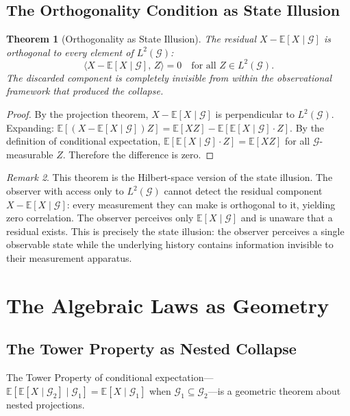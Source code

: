 \documentclass[12pt, a4paper, openany]{book}
\theoremstyle{plain}
\newtheorem{theorem}{Theorem}[chapter]
\theoremstyle{definition}
\theoremstyle{remark}
\newtheorem{remark}[theorem]{Remark}
\begin{document}
\section{The Orthogonality Condition as State Illusion}

\begin{theorem}[Orthogonality as State Illusion]
The residual $X - \mathbb{E}[X \mid \mathcal{G}]$ is orthogonal to every element
of $L^2(\mathcal{G})$:
\[
\bigl\langle X - \mathbb{E}[X \mid \mathcal{G}],\, Z \bigr\rangle = 0
\quad \text{for all } Z \in L^2(\mathcal{G}).
\]
The discarded component is completely invisible from within the observational
framework that produced the collapse.
\end{theorem}

\begin{proof}
By the projection theorem, $X - \mathbb{E}[X \mid \mathcal{G}]$ is perpendicular
to $L^2(\mathcal{G})$. Expanding: $\mathbb{E}[(X - \mathbb{E}[X\mid\mathcal{G}])Z] =
\mathbb{E}[XZ] - \mathbb{E}[\mathbb{E}[X\mid\mathcal{G}] \cdot Z]$.
By the definition of conditional expectation,
$\mathbb{E}[\mathbb{E}[X\mid\mathcal{G}] \cdot Z] = \mathbb{E}[XZ]$
for all $\mathcal{G}$-measurable $Z$. Therefore the difference is zero.
\end{proof}

\begin{remark}
This theorem is the Hilbert-space version of the state illusion. The observer
with access only to $L^2(\mathcal{G})$ cannot detect the residual component
$X - \mathbb{E}[X\mid\mathcal{G}]$: every measurement they can make is
orthogonal to it, yielding zero correlation. The observer perceives only
$\mathbb{E}[X\mid\mathcal{G}]$ and is unaware that a residual exists. This
is precisely the state illusion: the observer perceives a single observable
state while the underlying history contains information invisible to their
measurement apparatus.
\end{remark}

\chapter{The Algebraic Laws as Geometry}

\section{The Tower Property as Nested Collapse}

The Tower Property of conditional expectation---$\mathbb{E}[\mathbb{E}[X \mid
\mathcal{G}_2] \mid \mathcal{G}_1] = \mathbb{E}[X \mid \mathcal{G}_1]$ when
$\mathcal{G}_1 \subseteq \mathcal{G}_2$---is a geometric theorem about nested
projections.
\end{document}
